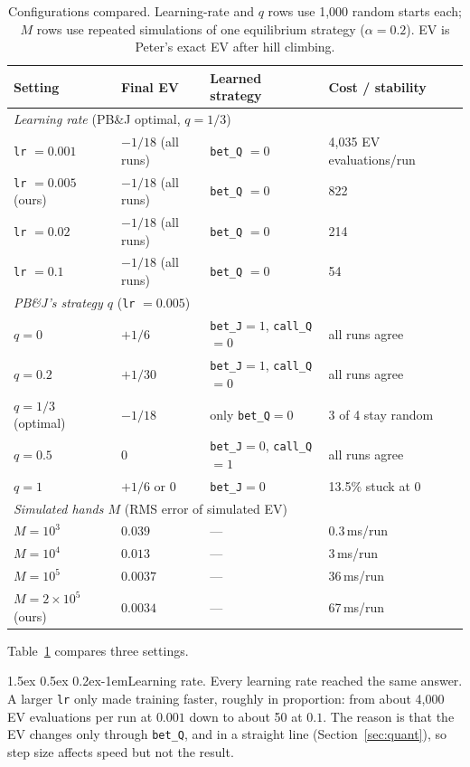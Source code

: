 \documentclass{article}
\makeatletter
\renewcommand{\paragraph}{\@startsection{paragraph}{4}{\z@}%
    {1.5ex \@plus 0.5ex \@minus 0.2ex}{-1em}{\normalsize\bf}}
\newcommand{\code}[1]{\texttt{#1}}
\newcommand{\peter}{Peter}
\newcommand{\pbj}{PB\&J}
\makeatother
\begin{document}
\begin{table}[tb]
\centering
\small
\caption{Configurations compared. Learning-rate and $q$ rows use 1{,}000
random starts each; $M$ rows use repeated simulations of one equilibrium
strategy ($\alpha = 0.2$). EV is \peter's exact EV after hill climbing.}
\label{tab:configs}
\begin{tabular}{llll}
\toprule
Setting & Final EV & Learned strategy & Cost / stability \\
\midrule
\multicolumn{4}{l}{\emph{Learning rate} (\pbj{} optimal, $q = 1/3$)} \\
\code{lr} $= 0.001$ & $-1/18$ (all runs) & \code{bet\_Q} $= 0$ & 4{,}035 EV evaluations/run \\
\code{lr} $= 0.005$ (ours) & $-1/18$ (all runs) & \code{bet\_Q} $= 0$ & 822 \\
\code{lr} $= 0.02$ & $-1/18$ (all runs) & \code{bet\_Q} $= 0$ & 214 \\
\code{lr} $= 0.1$ & $-1/18$ (all runs) & \code{bet\_Q} $= 0$ & 54 \\
\midrule
\multicolumn{4}{l}{\emph{\pbj's strategy $q$} (\code{lr} $= 0.005$)} \\
$q = 0$   & $+1/6$  & \code{bet\_J}$=1$, \code{call\_Q}$=0$ & all runs agree \\
$q = 0.2$ & $+1/30$ & \code{bet\_J}$=1$, \code{call\_Q}$=0$ & all runs agree \\
$q = 1/3$ (optimal) & $-1/18$ & only \code{bet\_Q}$=0$ & 3 of 4 stay random \\
$q = 0.5$ & $0$ & \code{bet\_J}$=0$, \code{call\_Q}$=1$ & all runs agree \\
$q = 1$   & $+1/6$ or $0$ & \code{bet\_J}$=0$ & 13.5\% stuck at $0$ \\
\midrule
\multicolumn{4}{l}{\emph{Simulated hands $M$} (RMS error of simulated EV)} \\
$M = 10^3$ & $0.039$ & --- & 0.3\,ms/run \\
$M = 10^4$ & $0.013$ & --- & 3\,ms/run \\
$M = 10^5$ & $0.0037$ & --- & 36\,ms/run \\
$M = 2\times10^5$ (ours) & $0.0034$ & --- & 67\,ms/run \\
\bottomrule
\end{tabular}
\end{table}

Table~\ref{tab:configs} compares three settings.

\paragraph{Learning rate.} Every learning rate reached the same answer. A
larger \code{lr} only made training faster, roughly in proportion: from about
4{,}000 EV evaluations per run at $0.001$ down to about 50 at $0.1$. The
reason is that the EV changes only through \code{bet\_Q}, and in a straight
line (Section~\ref{sec:quant}), so step size affects speed but not the result.
\end{document}
